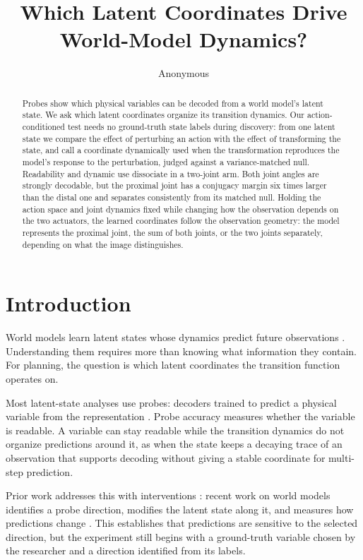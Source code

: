 \documentclass{article}
\title{Which Latent Coordinates Drive World-Model Dynamics?}
\author{Anonymous}
\begin{document}
\maketitle

\begin{abstract}
Probes show which physical variables can be decoded from a world model's latent state. We ask which latent coordinates organize its transition dynamics. Our action-conditioned test needs no ground-truth state labels during discovery: from one latent state we compare the effect of perturbing an action with the effect of transforming the state, and call a coordinate dynamically used when the transformation reproduces the model's response to the perturbation, judged against a variance-matched null. Readability and dynamic use dissociate in a two-joint arm. Both joint angles are strongly decodable, but the proximal joint has a conjugacy margin six times larger than the distal one and separates consistently from its matched null. Holding the action space and joint dynamics fixed while changing how the observation depends on the two actuators, the learned coordinates follow the observation geometry: the model represents the proximal joint, the sum of both joints, or the two joints separately, depending on what the image distinguishes. \GENERALITYSENT
\end{abstract}

\section{Introduction}

World models learn latent states whose dynamics predict future observations \citep{hafner2019planet,hafner2025dreamerv3}. Understanding them requires more than knowing what information they contain. For planning, the question is which latent coordinates the transition function operates on.

Most latent-state analyses use probes: decoders trained to predict a physical variable from the representation \citep{alain2017probes,belinkov2022probing}. Probe accuracy measures whether the variable is readable. A variable can stay readable while the transition dynamics do not organize predictions around it, as when the state keeps a decaying trace of an observation that supports decoding without giving a stable coordinate for multi-step prediction.

Prior work addresses this with interventions \citep{hewitt2019control,geiger2021causal,elazar2021amnesic}: recent work on world models identifies a probe direction, modifies the latent state along it, and measures how predictions change \citep{zhang2026probingwm}. This establishes that predictions are sensitive to the selected direction, but the experiment still begins with a ground-truth variable chosen by the researcher and a direction identified from its labels.
\end{document}
